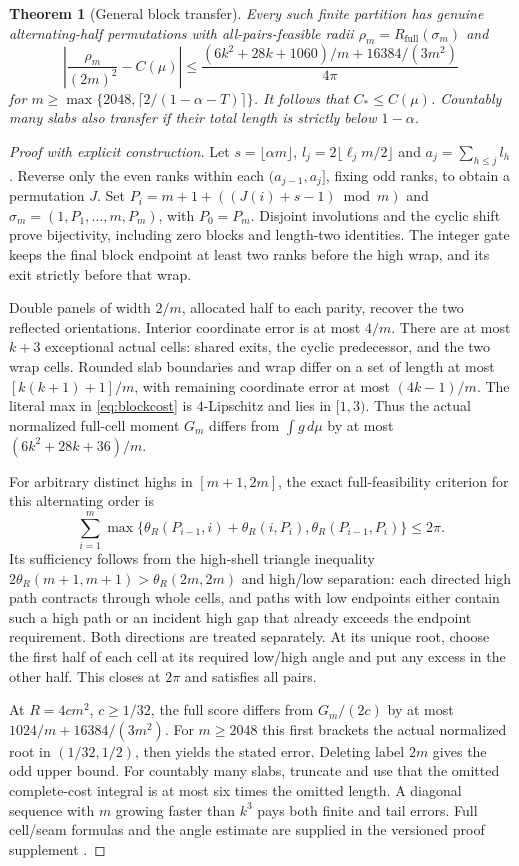 \documentclass[11pt]{article}
\newtheorem{theorem}{Theorem}
\theoremstyle{definition}\newtheorem{definition}[theorem]{Definition}
\theoremstyle{remark}\newtheorem{remark}[theorem]{Remark}
\newcommand{\full}{R_{\mathrm{full}}}
\newcommand{\CC}{C_\ast}
\begin{document}
\begin{theorem}[General block transfer]\label{thm:blocks}
Every such finite partition has genuine alternating-half permutations with
all-pairs-feasible radii $\rho_m=\full(\sigma_m)$ and
\[
 \left|\frac{\rho_m}{(2m)^2}-C(\mu)\right|
 \le\frac{(6k^2+28k+1060)/m+16384/(3m^2)}{4\pi}
\]
for $m\ge\max\{2048,\lceil2/(1-\alpha-T)\rceil\}$.
It follows that $\CC\le C(\mu)$. Countably many slabs also transfer
if their total length is strictly below $1-\alpha$.
\end{theorem}
\begin{proof}[Proof with explicit construction]
Let $s=\lfloor\alpha m\rfloor$, $l_j=2\lfloor\ell_jm/2\rfloor$ and
$a_j=\sum_{h\le j}l_h$. Reverse only the even ranks within each
$(a_{j-1},a_j]$, fixing odd ranks, to obtain a permutation $J$.
Set $P_i=m+1+((J(i)+s-1)\bmod m)$ and
$\sigma_m=(1,P_1,\ldots,m,P_m)$, with $P_0=P_m$.
Disjoint involutions and the cyclic shift prove bijectivity, including
zero blocks and length-two identities. The integer gate keeps the final
block endpoint at least two ranks before the high wrap, and its exit
strictly before that wrap.

Double panels of width $2/m$, allocated half to each parity, recover
the two reflected orientations. Interior coordinate error is at most
$4/m$. There are at most $k+3$ exceptional actual cells: shared exits,
the cyclic predecessor, and the two wrap cells. Rounded slab boundaries
and wrap differ on a set of length at most $[k(k+1)+1]/m$, with remaining
coordinate error at most $(4k-1)/m$. The literal max in
\eqref{eq:blockcost} is $4$-Lipschitz and lies in $[1,3)$.
Thus the actual normalized full-cell moment $G_m$ differs from
$\int g\,d\mu$ by at most $(6k^2+28k+36)/m$.

For arbitrary distinct highs in $[m+1,2m]$, the exact full-feasibility
criterion for this alternating order is
\[
 \sum_{i=1}^m\max\{\theta_R(P_{i-1},i)+\theta_R(i,P_i),
                         \theta_R(P_{i-1},P_i)\}\le2\pi.
\]
Its sufficiency follows from the high-shell triangle inequality
$2\theta_R(m+1,m+1)>\theta_R(2m,2m)$ and high/low separation:
each directed high path contracts through whole cells, and paths with
low endpoints either contain such a high path or an incident high gap
that already exceeds the endpoint requirement. Both directions are
treated separately. At its unique root, choose the first half of each
cell at its required low/high angle and put any excess in the other half.
This closes at $2\pi$ and satisfies all pairs.

At $R=4cm^2$, $c\ge1/32$, the full score differs from $G_m/(2c)$ by
at most $1024/m+16384/(3m^2)$. For $m\ge2048$ this first brackets
the actual normalized root in $(1/32,1/2)$, then yields the stated error.
Deleting label $2m$ gives the odd upper bound. For countably many slabs,
truncate and use that the omitted complete-cost integral is at most six
times the omitted length. A diagonal sequence with $m$ growing faster
than $k^3$ pays both finite and tail errors. Full cell/seam formulas and
the angle estimate are supplied in the versioned proof supplement \cite{blocks}.
\end{proof}
\end{document}
